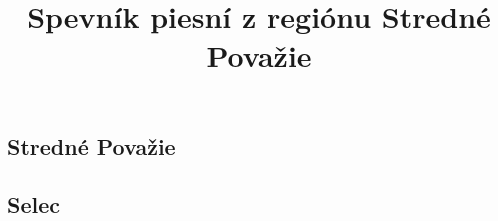 \documentclass[a4paper]{book}
\title{Spevník piesní z regiónu Stredné Považie}
\begin{document}
\maketitle
\begin{center}

\chapter*{Stredné Považie}
\section*{Selec}
{%
\parindent 0pt
\noindent
\ifx\preLilyPondExample \undefined
\else
  \expandafter\preLilyPondExample
\fi
\def\lilypondbook{}%

\ifx\postLilyPondExample \undefined
\else
  \expandafter\postLilyPondExample
\fi
}
{%
\parindent 0pt
\noindent
\ifx\preLilyPondExample \undefined
\else
  \expandafter\preLilyPondExample
\fi
\def\lilypondbook{}%

\ifx\postLilyPondExample \undefined
\else
  \expandafter\postLilyPondExample
\fi
}
{%
\parindent 0pt
\noindent
\ifx\preLilyPondExample \undefined
\else
  \expandafter\preLilyPondExample
\fi
\def\lilypondbook{}%

\ifx\postLilyPondExample \undefined
\else
  \expandafter\postLilyPondExample
\fi
}
{%
\parindent 0pt
\noindent
\ifx\preLilyPondExample \undefined
\else
  \expandafter\preLilyPondExample
\fi
\def\lilypondbook{}%

\ifx\postLilyPondExample \undefined
\else
  \expandafter\postLilyPondExample
\fi
}
{%
\parindent 0pt
\noindent
\ifx\preLilyPondExample \undefined
\else
  \expandafter\preLilyPondExample
\fi
\def\lilypondbook{}%

\ifx\postLilyPondExample \undefined
\else
  \expandafter\postLilyPondExample
\fi
}
{%
\parindent 0pt
\noindent
\ifx\preLilyPondExample \undefined
\else
  \expandafter\preLilyPondExample
\fi
\def\lilypondbook{}%

\ifx\postLilyPondExample \undefined
\else
  \expandafter\postLilyPondExample
\fi
}



\end{center}
\end{document}
